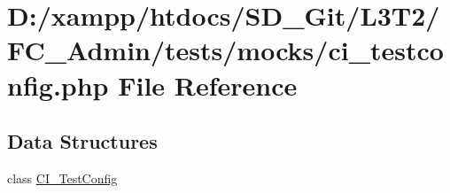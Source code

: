 \hypertarget{_admin_2tests_2mocks_2ci__testconfig_8php}{}\section{D\+:/xampp/htdocs/\+S\+D\+\_\+\+Git/\+L3\+T2/\+F\+C\+\_\+\+Admin/tests/mocks/ci\+\_\+testconfig.php File Reference}
\label{_admin_2tests_2mocks_2ci__testconfig_8php}
\subsection*{Data Structures}
\begin{DoxyCompactItemize}
\item 
class \hyperlink{class_c_i___test_config}{C\+I\+\_\+\+Test\+Config}
\end{DoxyCompactItemize}
